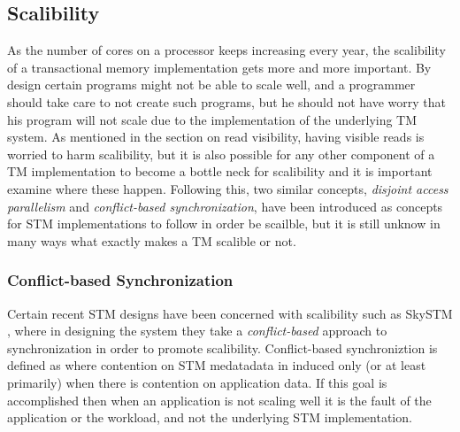 \subsection{Scalibility}
As the number of cores on a processor keeps increasing every year, the scalibility of a transactional memory implementation gets more and more important.
By design certain programs might not be able to scale well, and a programmer should take care to not create such programs, but he should not have worry that his program will not scale due to the implementation of the underlying TM system.
As mentioned in the section on read visibility, having visible reads is worried to harm scalibility, but it is also possible for any other component of a TM implementation to become a bottle neck for scalibility and it is important examine where  these happen.
Following this, two similar concepts, \emph{disjoint access parallelism} and \emph{conflict-based synchronization}, have been introduced as concepts for STM implementations to follow in order be scailble, but it is still unknow in many ways what exactly makes a TM scalible or not.

\subsubsection{Conflict-based Synchronization}
Certain recent STM designs have been concerned with scalibility such as SkySTM \cite{lev:anatomy:transact:2009}, where in designing the system they take a \emph{conflict-based} approach to synchronization in order to promote scalibility.
Conflict-based synchroniztion is defined as where contention on STM medatadata in induced only (or at least primarily) when there is contention on application data.
If this goal is accomplished then when an application is not scaling well it is the fault of the application or the workload, and not the underlying STM implementation.

